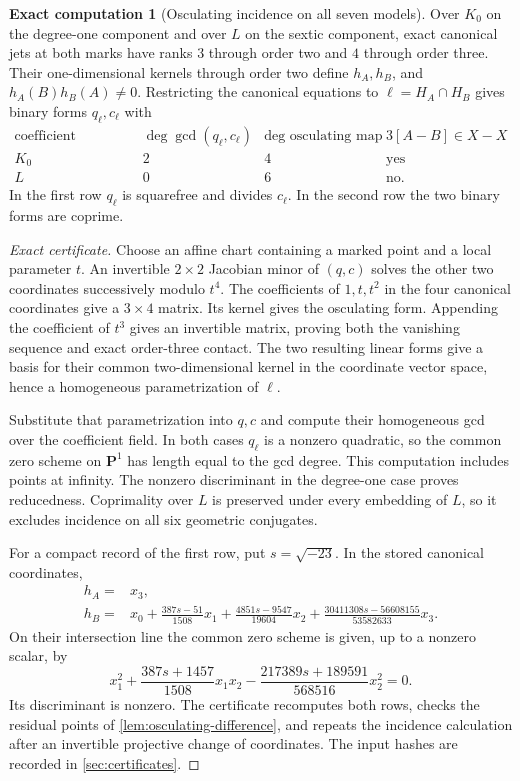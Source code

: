 \documentclass[11pt]{amsart}
\theoremstyle{definition}
\newtheorem{computation}[computation]{Exact computation}
\theoremstyle{remark}
\newcommand{\PP}{\mathbf P}
\begin{document}
\begin{computation}[Osculating incidence on all seven models]
\label{comp:osculating}
Over $K_0$ on the degree-one component and over $L$ on the sextic
component, exact canonical jets at both marks have ranks $3$ through
order two and $4$ through order three.  Their one-dimensional kernels
through order two define $h_A,h_B$, and
$h_A(B)h_B(A)\ne0$.
Restricting the canonical equations to $\ell=H_A\cap H_B$ gives
binary forms $q_\ell,c_\ell$ with
\[
\begin{array}{c|c|c|c}
 \text{coefficient component}&
 \deg\gcd(q_\ell,c_\ell)&
 \deg\text{ osculating map}&
 3[A-B]\in X-X\\
 \hline
 K_0&2&4&\text{yes}\\
 L&0&6&\text{no}.
\end{array}
\]
In the first row $q_\ell$ is squarefree and divides $c_\ell$.
In the second row the two binary forms are coprime.
\end{computation}

\begin{proof}[Exact certificate]
Choose an affine chart containing a marked point and a local parameter
$t$.  An invertible $2\times2$ Jacobian minor of $(q,c)$ solves the
other two coordinates successively modulo $t^4$.
The coefficients of $1,t,t^2$ in the four canonical coordinates
give a $3\times4$ matrix.  Its kernel gives the osculating form.
Appending the coefficient of $t^3$ gives an invertible matrix,
proving both the vanishing sequence and exact order-three contact.
The two resulting linear forms give a basis for their common
two-dimensional kernel in the coordinate vector space, hence a
homogeneous parametrization of $\ell$.

Substitute that parametrization into $q,c$ and compute their
homogeneous gcd over the coefficient field.
In both cases $q_\ell$ is a nonzero quadratic, so the common zero
scheme on $\PP^1$ has length equal to the gcd degree.
This computation includes points at infinity.
The nonzero discriminant in the degree-one case proves reducedness.
Coprimality over $L$ is preserved under every embedding of $L$,
so it excludes incidence on all six geometric conjugates.

For a compact record of the first row, put $s=\sqrt{-23}$.
In the stored canonical coordinates,
\[
 \begin{aligned}
 h_A={}&x_3,\\
 h_B={}&x_0+\frac{387s-51}{1508}x_1
            +\frac{4851s-9547}{19604}x_2
            +\frac{30411308s-56608155}{53582633}x_3.
 \end{aligned}
\]
On their intersection line the common zero scheme is given, up to
a nonzero scalar, by
\[
 x_1^2+\frac{387s+1457}{1508}x_1x_2
       -\frac{217389s+189591}{568516}x_2^2=0.
\]
Its discriminant is nonzero.
The certificate
recomputes both rows, checks the residual points of
\cref{lem:osculating-difference}, and repeats the incidence calculation
after an invertible projective change of coordinates.
The input hashes are recorded in \cref{sec:certificates}.
\end{proof}
\end{document}
